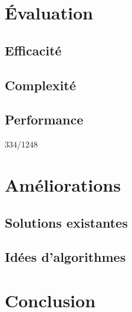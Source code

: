 \documentclass{article}
\begin{document}
\section{Évaluation}

\subsection{Efficacité}

\subsection{Complexité}

\subsection{Performance}
334/1248

\section{Améliorations}

\subsection{Solutions existantes}

\subsection{Idées d'algorithmes}



\section*{Conclusion}
\end{document}
